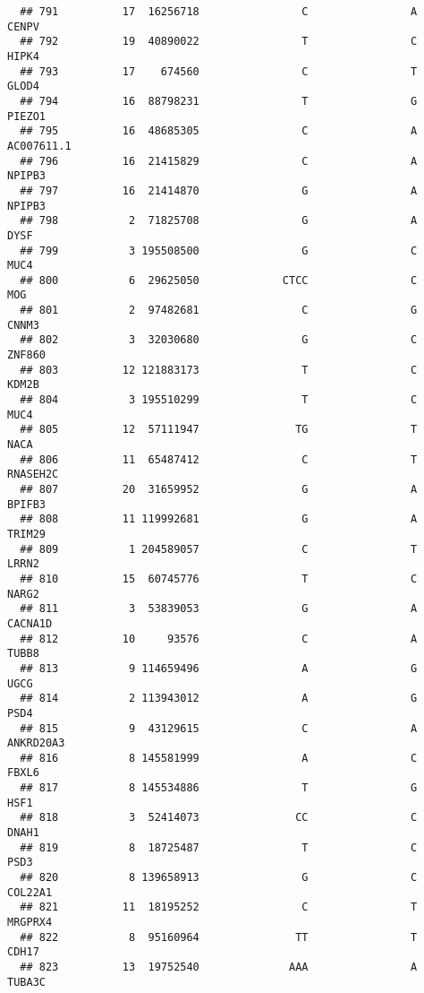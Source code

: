 \documentclass[12pt,twoside]{reedthesis}
\theoremstyle{definition}
\theoremstyle{definition}
\theoremstyle{remark}
\begin{document}
\begin{verbatim}
  ## 791          17  16256718                C                A          CENPV
  ## 792          19  40890022                T                C          HIPK4
  ## 793          17    674560                C                T          GLOD4
  ## 794          16  88798231                T                G         PIEZO1
  ## 795          16  48685305                C                A     AC007611.1
  ## 796          16  21415829                C                A         NPIPB3
  ## 797          16  21414870                G                A         NPIPB3
  ## 798           2  71825708                G                A           DYSF
  ## 799           3 195508500                G                C           MUC4
  ## 800           6  29625050             CTCC                C            MOG
  ## 801           2  97482681                C                G          CNNM3
  ## 802           3  32030680                G                C         ZNF860
  ## 803          12 121883173                T                C          KDM2B
  ## 804           3 195510299                T                C           MUC4
  ## 805          12  57111947               TG                T           NACA
  ## 806          11  65487412                C                T       RNASEH2C
  ## 807          20  31659952                G                A         BPIFB3
  ## 808          11 119992681                G                A         TRIM29
  ## 809           1 204589057                C                T          LRRN2
  ## 810          15  60745776                T                C          NARG2
  ## 811           3  53839053                G                A        CACNA1D
  ## 812          10     93576                C                A          TUBB8
  ## 813           9 114659496                A                G           UGCG
  ## 814           2 113943012                A                G           PSD4
  ## 815           9  43129615                C                A      ANKRD20A3
  ## 816           8 145581999                A                C          FBXL6
  ## 817           8 145534886                T                G           HSF1
  ## 818           3  52414073               CC                C          DNAH1
  ## 819           8  18725487                T                C           PSD3
  ## 820           8 139658913                G                C        COL22A1
  ## 821          11  18195252                C                T        MRGPRX4
  ## 822           8  95160964               TT                T          CDH17
  ## 823          13  19752540              AAA                A         TUBA3C

\end{verbatim}
\end{document}
